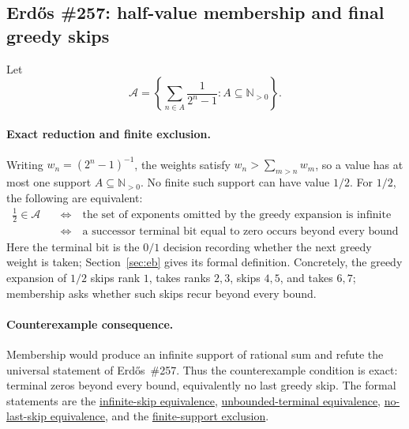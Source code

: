 \documentclass[11pt]{article}
\newcommand{\commit}{99f4bf47422abbd8757cbb22b50ba079d764d3a7}
\newcommand{\repobase}{https://github.com/wcook04/plectis-erdos/blob/\commit}
\newcommand{\PK}{Erdos249257}
\newcommand{\lword}[4]{\href{\repobase/\PK/#1\#L#2}{#4}}
\theoremstyle{definition}
\theoremstyle{remark}
\newcommand{\Npos}{\mathbb{N}_{>0}}
\begin{document}
\subsection{Erd\H{o}s \#257: half-value membership and final greedy skips}
\label{res:halfstory}

Let
\[
  \mathcal A=\left\{\sum_{n\in A}\frac1{2^n-1}:A\subseteq\Npos\right\}.
\]

\paragraph{Exact reduction and finite exclusion.}
Writing \(w_n=(2^n-1)^{-1}\), the weights satisfy
\(w_n>\sum_{m>n}w_m\), so a value has at most one support
\(A\subseteq\Npos\).  No finite such support can have value \(1/2\).  For
\(1/2\), the following are equivalent:
\[
\begin{aligned}
\frac12\in\mathcal A
&\quad\Longleftrightarrow\quad
\text{the set of exponents omitted by the greedy expansion is infinite}\\
&\quad\Longleftrightarrow\quad
\text{a successor terminal bit equal to zero occurs beyond every bound}
\end{aligned}
\]
Here the terminal bit is the \(0/1\) decision recording whether the next
greedy weight is taken; Section~\ref{sec:eb} gives its formal definition.
Concretely, the greedy expansion of \(1/2\) skips rank \(1\), takes ranks
\(2,3\), skips \(4,5\), and takes \(6,7\); membership asks whether such
skips recur beyond every bound.

\paragraph{Counterexample consequence.}
Membership would produce an infinite support of rational sum and refute the
universal statement of Erd\H{o}s~\#257.  Thus the counterexample condition is
exact: terminal zeros beyond every bound, equivalently no last greedy skip.
The formal statements are the
\lword{GreedyAchievementSet.lean}{2583}{half_mem_mersenneAchievementSet_iff_greedySkippedSupport_infinite}{infinite-skip equivalence},
\lword{HalfCylinderHalfMembershipClassification.lean}{126}{half_mem_mersenneAchievementSet_iff_unboundedTerminalFalse}{unbounded-terminal equivalence},
\lword{HalfCylinderHalfMembershipClassification.lean}{235}{half_mem_mersenneAchievementSet_iff_no_lastHalfGreedySkip}{no-last-skip equivalence},
and the
\lword{HalfCarryReachability.lean}{589}{finite_boolSupport_ne_half}{finite-support exclusion}.
\end{document}
